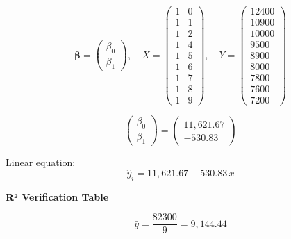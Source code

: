 \documentclass[12pt,a4paper]{article}
\begin{document}
\[
\bm{\beta} = \begin{pmatrix}\beta_0\\\beta_1\end{pmatrix},\quad
X = \begin{pmatrix}1&0\\1&1\\1&2\\1&4\\1&5\\1&6\\1&7\\1&8\\1&9\end{pmatrix},\quad
Y = \begin{pmatrix}12400\\10900\\10000\\9500\\8900\\8000\\7800\\7600\\7200\end{pmatrix}
\]

\[
\begin{pmatrix}\beta_0\\\beta_1\end{pmatrix} = \begin{pmatrix}11{,}621.67\\-530.83\end{pmatrix}
\]

Linear equation:
\[
\hat{y}_i = 11{,}621.67 - 530.83\,x
\]

\textbf{R² Verification Table}

\[
\bar{y} = \frac{82300}{9} = 9{,}144.44
\]
\end{document}

